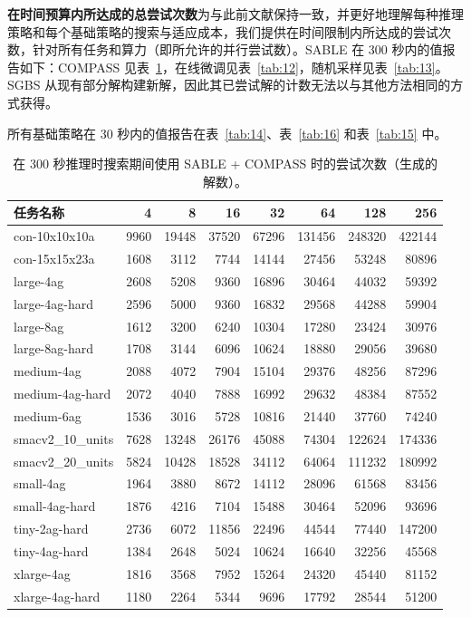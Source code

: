 \documentclass[11pt,UTF8,fontset=fandol]{ctexart}
\begin{document}
\textbf{在时间预算内所达成的总尝试次数}\quad 为与此前文献保持一致，并更好地理解每种推理策略和每个基础策略的搜索与适应成本，我们提供在时间限制内所达成的尝试次数，针对所有任务和算力（即所允许的并行尝试数）。SABLE 在 300 秒内的值报告如下：COMPASS 见表~\ref{tab:11}，在线微调见表~\ref{tab:12}，随机采样见表~\ref{tab:13}。SGBS 从现有部分解构建新解，因此其已尝试解的计数无法以与其他方法相同的方式获得。

所有基础策略在 30 秒内的值报告在表~\ref{tab:14}、表~\ref{tab:16} 和表~\ref{tab:15} 中。

\begin{table}[H]\centering
\caption{在 300 秒推理时搜索期间使用 SABLE + COMPASS 时的尝试次数（生成的解数）。}
\label{tab:11}
\small
\begin{tabular}{lrrrrrrr}
\toprule
任务名称 & 4 & 8 & 16 & 32 & 64 & 128 & 256\\
\midrule
con-10x10x10a & 9960 & 19448 & 37520 & 67296 & 131456 & 248320 & 422144\\
con-15x15x23a & 1608 & 3112 & 7744 & 14144 & 27456 & 53248 & 80896\\
large-4ag & 2608 & 5208 & 9360 & 16896 & 30464 & 44032 & 59392\\
large-4ag-hard & 2596 & 5000 & 9360 & 16832 & 29568 & 44288 & 59904\\
large-8ag & 1612 & 3200 & 6240 & 10304 & 17280 & 23424 & 30976\\
large-8ag-hard & 1708 & 3144 & 6096 & 10624 & 18880 & 29056 & 39680\\
medium-4ag & 2088 & 4072 & 7904 & 15104 & 29376 & 48256 & 87296\\
medium-4ag-hard & 2072 & 4040 & 7888 & 16992 & 29632 & 48384 & 87552\\
medium-6ag & 1536 & 3016 & 5728 & 10816 & 21440 & 37760 & 74240\\
smacv2\_10\_units & 7628 & 13248 & 26176 & 45088 & 74304 & 122624 & 174336\\
smacv2\_20\_units & 5824 & 10428 & 18528 & 34112 & 64064 & 111232 & 180992\\
small-4ag & 1964 & 3880 & 8672 & 14112 & 28096 & 61568 & 83456\\
small-4ag-hard & 1876 & 4216 & 7104 & 15488 & 30464 & 52096 & 93696\\
tiny-2ag-hard & 2736 & 6072 & 11856 & 22496 & 44544 & 77440 & 147200\\
tiny-4ag-hard & 1384 & 2648 & 5024 & 10624 & 16640 & 32256 & 45568\\
xlarge-4ag & 1816 & 3568 & 7952 & 15264 & 24320 & 45440 & 81152\\
xlarge-4ag-hard & 1180 & 2264 & 5344 & 9696 & 17792 & 28544 & 51200\\
\bottomrule
\end{tabular}
\end{table}
\end{document}
